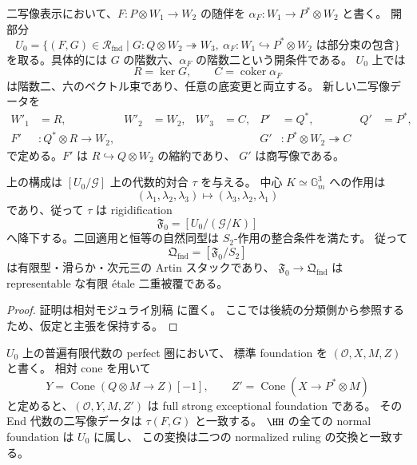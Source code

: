 二写像表示において、$F:P\otimes W_1\to W_2$ の随伴を
$\alpha_F:W_1\to P^*\otimes W_2$ と書く。
開部分
\[
 U_0=\{(F,G)\in\mathcal R_{\mathrm{fnd}}\mid
           G:Q\otimes W_2\twoheadrightarrow W_3,
           \ \alpha_F:W_1\hookrightarrow P^*\otimes W_2
           \text{ は部分束の包含}\}
\]
を取る。具体的には $G$ の階数六、$\alpha_F$ の階数二という開条件である。
$U_0$ 上では
\[
 R=\ker G,\qquad C=\operatorname{coker}\alpha_F
\]
は階数二、六のベクトル束であり、任意の底変更と両立する。
新しい二写像データを
\begin{align*}
 W'_1&=R,& W'_2&=W_2,& W'_3&=C,&
 P'&=Q^*,& Q'&=P^*,\\
 F'&:Q^*\otimes R\longrightarrow W_2,&&&&&
 G'&:P^*\otimes W_2\twoheadrightarrow C
\end{align*}
で定める。$F'$ は $R\hookrightarrow Q\otimes W_2$ の縮約であり、
$G'$ は商写像である。

\begin{proposition}
\label{prop:relative-ruling-involution}
上の構成は $[U_0/\mathcal G]$ 上の代数的対合 $\tau$ を与える。
中心 $K\simeq\mathbb G_m^3$ への作用は
\[
 (\lambda_1,\lambda_2,\lambda_3)
 \longmapsto (\lambda_3,\lambda_2,\lambda_1)
\]
であり、従って $\tau$ は rigidification
\[
 \mathfrak F_0=[U_0/(\mathcal G/K)]
\]
へ降下する。二回適用と恒等の自然同型は $S_2$-作用の整合条件を満たす。
従って
\[
 \mathfrak Q_{\mathrm{fnd}}=[\mathfrak F_0/S_2]
\]
は有限型・滑らか・次元三の Artin スタックであり、
$\mathfrak F_0\to\mathfrak Q_{\mathrm{fnd}}$ は representable な有限 étale
二重被覆である。
\end{proposition}

\begin{proof}
証明は相対モジュライ別稿 \cite[\texttt{foundation_stack} 節]{QuadricModuli2026} に置く。
ここでは後続の分類側から参照するため、仮定と主張を保持する。
\end{proof}

\begin{proposition}
\label{prop:ruling-involution-mutation}
$U_0$ 上の普遍有限代数の perfect 圏において、
標準 foundation を $(\mathcal O,X,M,Z)$ と書く。
相対 cone を用いて
\[
 Y=\operatorname{Cone}(Q\otimes M\longrightarrow Z)[-1],
 \qquad
 Z'=\operatorname{Cone}(X\longrightarrow P^*\otimes M)
\]
と定めると、$(\mathcal O,Y,M,Z')$ は full strong exceptional foundation である。
その End 代数の二写像データは $\tau(F,G)$ と一致する。
$\HH$ の全ての normal foundation は $U_0$ に属し、
この変換は二つの normalized ruling の交換と一致する。
\end{proposition}

